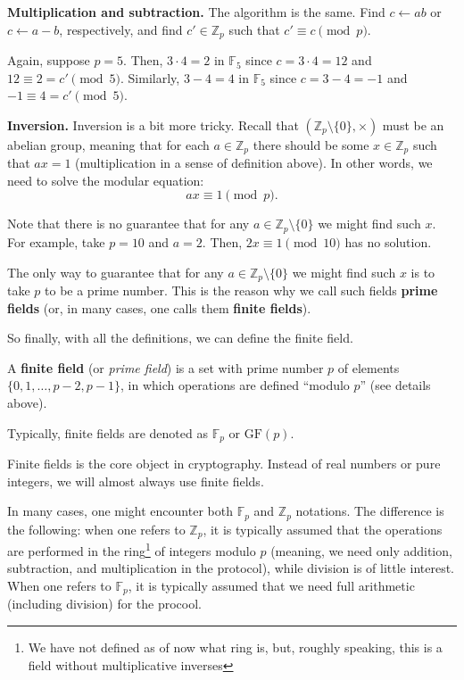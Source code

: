 \documentclass[../lecture-notes.tex]{subfiles}
\begin{document}
\textbf{Multiplication and subtraction.} The algorithm is the same. Find $c \gets ab$ or $c \gets a-b$, respectively, and find $c' \in \mathbb{Z}_p$ such that $c' \equiv c \pmod{p}$.

\begin{example}
    Again, suppose $p=5$. Then, $3 \cdot 4 = 2$ in $\mathbb{F}_5$ since $c=3 \cdot 4 = 12$ and $12 \equiv 2 = c' \pmod{5}$. Similarly, $3-4 = 4$ in $\mathbb{F}_5$ since $c=3-4=-1$ and $-1 \equiv 4 = c' \pmod{5}$.
\end{example}

\textbf{Inversion.} Inversion is a bit more tricky. Recall that $(\mathbb{Z}_p \setminus \{0\}, \times)$ must be an abelian group, meaning that for each $a \in \mathbb{Z}_p$ there should be some $x \in \mathbb{Z}_p$ such that $ax = 1$ (multiplication in a sense of definition above). In other words, we need to solve the modular equation:
\begin{equation*}
    ax \equiv 1 \pmod{p}.
\end{equation*}

Note that there is no guarantee that for any $a \in \mathbb{Z}_p \setminus \{0\}$ we might find such $x$. For example, take $p=10$ and $a=2$. Then, $2x \equiv 1 \pmod{10}$ has no solution. 

The only way to guarantee that for any $a \in \mathbb{Z}_p \setminus \{0\}$ we might find such $x$ is to take $p$ to be a prime number. This is the reason why we call such fields \textbf{prime fields} (or, in many cases, one calls them \textbf{finite fields}).

So finally, with all the definitions, we can define the finite field.

\begin{definition}
    A \textbf{finite field} (or \textit{prime field}) is a set with prime number $p$ of elements $\{0,1,\dots,p-2,p-1\}$, in which operations are defined ``modulo $p$'' (see details above). 

    Typically, finite fields are denoted as $\mathbb{F}_p$ or $\text{GF}(p)$.
\end{definition}

Finite fields is the core object in cryptography. Instead of real numbers or pure integers, we will almost always use finite fields.

\begin{remark}
    In many cases, one might encounter both $\mathbb{F}_p$ and $\mathbb{Z}_p$ notations. The difference is the following: when one refers to $\mathbb{Z}_p$, it is typically assumed that the operations are performed in the ring\footnote{We have not defined as of now what ring is, but, roughly speaking, this is a field without multiplicative inverses} of integers modulo $p$ (meaning, we need only addition, subtraction, and multiplication in the protocol), while division is of little interest. When one refers to $\mathbb{F}_p$, it is typically assumed that we need full arithmetic (including division) for the procool.
\end{remark}
\end{document}
